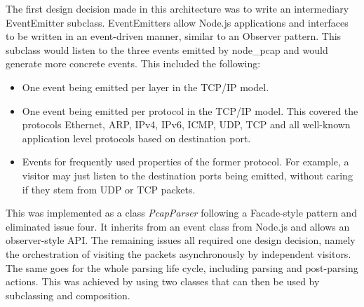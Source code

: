 The first design decision made in this architecture was to write an intermediary EventEmitter subclass. EventEmitters allow Node.js applications and interfaces to be written in an event-driven manner, similar to an Observer pattern. This subclass would listen to the three events emitted by node\_pcap and would generate more concrete events. This included the following:
\begin{itemize}
    \item One event being emitted per layer in the TCP/IP model.
    \item One event being emitted per protocol in the TCP/IP model. This covered the protocols Ethernet, ARP, IPv4, IPv6, ICMP, UDP, TCP and all well-known application level protocols based on destination port.
    \item Events for frequently used properties of the former protocol. For example, a visitor may just listen to the destination ports being emitted, without caring if they stem from UDP or TCP packets.
\end{itemize}{}
This was implemented as a class \textit{PcapParser} following a Facade-style pattern and eliminated issue four. It inherits from an event class from Node.js and allows an observer-style API. The remaining issues all required one design decision, namely the orchestration of visiting the packets asynchronously by independent visitors. The same goes for the whole parsing life cycle, including parsing and post-parsing actions. This was achieved by using two classes that can then be used by subclassing and composition.

